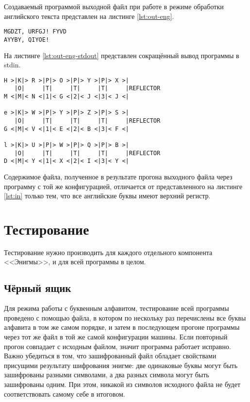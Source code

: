 \documentclass[14pt, oneside, a4paper]{extreport}
\begin{document}
Создаваемый программой выходной файл при работе в режиме обработки английского текста представлен на листинге \ref{lst:out-eng}.
\begin{lstlisting}[caption={Входной файл}, label={lst:out-eng}]
MGDZT, URFGJ! FYVD
AYYBY, QIYOE!
\end{lstlisting}

На листинге \ref{lst:out-eng-stdout} представлен сокращённый вывод программы в stdin.

\begin{lstlisting}[caption={Вывод в stdout для первых трёх букв}, label={lst:out-eng-stdout}]
H >|K|> R >|P|> O >|P|> Y >|P|> X >|
   |O|     |T|     |T|     |T|     |REFLECTOR
M <|M|< N <|1|< G <|2|< J <|3|< J <| 

e >|K|> W >|P|> Y >|P|> Z >|P|> S >|
   |O|     |T|     |T|     |T|     |REFLECTOR
G <|M|< V <|1|< E <|2|< B <|3|< F <|

l >|K|> U >|P|> W >|P|> Q >|P|> B >|
   |O|     |T|     |T|     |T|     |REFLECTOR
D <|M|< Y <|1|< X <|2|< I <|3|< Y <|
\end{lstlisting}

Содержимое файла, полученное в результате прогона выходного файла через программу с той же конфигурацией, отличается от представленного на листинге \ref{lst:in} только тем, что все английские буквы имеют верхний регистр.

\chapter{Тестирование}
Тестирование нужно производить для каждого отдельного компонента <<Энигмы>>, и для всей программы в целом.

\section{Чёрный ящик}
Для режима работы с буквенным алфавитом, тестирование всей программы проведено с помощью файла, в котором по нескольку раз перечислены все буквы алфавита в том же самом порядке, и затем в последующем прогоне программы через тот же файл в той же самой конфигурации машины. Если повторный прогон совпадает с исходным файлом, значит программа работает исправно. Важно убедиться в том, что зашифрованный файл обладает свойствами присущими результату шифрования энигме: две одинаковые буквы могут быть зашифрованы разными символами, а два разных символа могут быть зашифрованы одним. При этом, никакой из символов исходного файла не будет соответствовать самому себе в итоговом.
\end{document}
